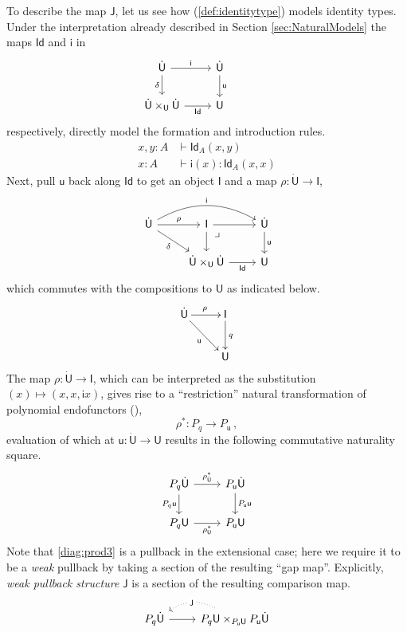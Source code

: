 \documentclass[12pt,reqno]{amsart}
\renewcommand{\to}{\ensuremath{\rightarrow}}
\newcommand{\Id}{\mathsf{Id}}
\renewcommand{\t}{\ensuremath{\mathsf{u}}}
\newcommand{\T}{\ensuremath{\mathsf{U}}}
\newcommand{\TT}{\ensuremath{\dot{\mathsf{U}}}}
\newcommand{\pbcorner}{\arrow[dr,phantom,"\lrcorner" very near start, shift right=.5ex]} %
\theoremstyle{remark}
\theoremstyle{definition}
\begin{document}
To describe the map $\mathsf{J}$, let us see how (\ref{def:identitytype}) models identity types.  Under the interpretation already described in Section \ref{sec:NaturalModels} the maps $\Id$ and $\mathsf{i}$  in 
\begin{equation*}%
\begin{tikzcd}
	\TT \ar[r,"\mathsf{i}"] \ar[d,swap,"\delta"] &  \TT \ar[d, "\t"]\\  
	\TT \times_\T \TT \ar[r, swap,"\mathsf{Id}"] & \T
 \end{tikzcd}\qquad \qquad 
 \end{equation*}
respectively, directly model the formation and introduction rules.
\begin{align*}
x, y:A &\vdash \Id_A(x, y)\\
x: A &\vdash \mathsf{i}(x) : \Id_A(x, x)
\end{align*}
Next, pull $\t$ back along $\mathsf{Id}$ to get an object $\mathsf{I}$ and a map $\rho  : \TT \to \mathsf{I}$,
%
\begin{equation*}
\begin{tikzcd}
\TT \ar[rd,swap,"{\delta}"] \ar[r,"{\rho}"] \ar[rr, bend left,"{\mathsf{i}}"] & \mathsf{I} \ar[r]  \ar[d] \pbcorner &  \TT \ar[d, "\t"]\\
& \TT \times_\T \TT  \ar[r, swap,"{\mathsf{Id}}"]  & \T
\end{tikzcd}
\end{equation*}
%
which commutes with the compositions to $\T$ as indicated below.
%
\begin{equation*}
\xymatrix{
\TT \ar[rd]_{\t} \ar[r]^{\rho} & \mathsf{I} \ar[d]^{q}  \\
& \T 
}
\end{equation*}
%
The map $\rho  : \TT \to \mathsf{I}$, which can be interpreted as the substitution $(x) \mapsto (x, x, \mathsf{i}x)$, gives rise to a ``restriction'' natural transformation of polynomial endofunctors (\cite{GambinoKoch:2013}),
\[
\rho^* : P_q \to P_\t\,,
\]
evaluation of which at $\t:\TT \to\T$ results in the following commutative naturality square.
\begin{equation}\label{diag:prod3}
\begin{tikzcd}
P_q\TT \ar[d,swap, "{P_q \t}"] \ar[r, "{\rho^{*}_{\TT}}"] & P_\t\TT \ar[d, "{P_\t \t}"] \\
P_q\T \ar[r,swap, "{\rho^{*}_{\T}}"] &  P_\t\T 
\end{tikzcd}
\end{equation}
%
Note that \eqref{diag:prod3} is a pullback in the extensional case; here we require it to be a \emph{weak} pullback by taking a section of the resulting ``gap map''.   Explicitly, \emph{weak pullback structure} $\mathsf{J}$ is a section of the resulting comparison map.
\begin{equation}\label{def:wps}
\begin{tikzcd}
P_q \TT  \ar[r] & \ar[l, bend right, dotted, "\mathsf{J}" description] P_q\T \times_{P_\t\T} P_\t\TT 
\end{tikzcd}
\end{equation}
\end{document}

